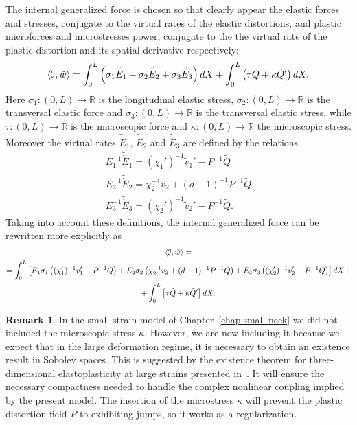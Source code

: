 \documentclass[a4paper,10pt,oneside]{amsbook}
\numberwithin{section}{chapter}
\numberwithin{equation}{chapter}
\theoremstyle{definition}
\newtheorem{rmk}[prop]{Remark}
\DeclarePairedDelimiter{\dual}{\langle}{\rangle}
\begin{document}
The internal generalized force is chosen so that clearly appear the elastic forces and stresses, conjugate to the virtual rates of the elastic distortions, and plastic microforces and microstresses power, conjugate to the the virtual rate of the plastic distortion and its spatial derivative respectively:
\[
\dual{\mathcal{I},\tilde w}=\int_0^L\left(\sigma_1\tilde{\dot E}_1+\sigma_2\tilde{\dot E}_2+\sigma_3\tilde{\dot E}_3\right)dX+\int_0^L\left(\tau\tilde{Q}+\kappa\tilde{Q}'\right)dX.
\]
Here $\sigma_1\colon(0,L)\to\mathbb{R}$ is the longitudinal elastic stress, $\sigma_2\colon(0,L)\to\mathbb{R}$ is the transversal elastic force and $\sigma_3\colon(0,L)\to\mathbb{R}$ is the transversal elastic stress, while $\tau\colon(0,L)\to\mathbb{R}$ is the microscopic force and $\kappa\colon(0,L)\to\mathbb{R}$ the microscopic stress. Moreover the virtual rates $\tilde{\dot E}_1$, $\tilde{\dot E}_2$ and $\tilde{\dot E}_3$ are defined by the relations
\begin{gather*}
E_1^{-1}\tilde{\dot E}_1=(\chi_1')^{-1}\tilde{v}_1'-P^{-1}\tilde{Q} \\
E_2^{-1}\tilde{\dot E}_2=\chi_2^{-1}\tilde{v}_2+(d-1)^{-1}P^{-1}\tilde{Q}\\
E_3^{-1}\tilde{\dot E}_3=(\chi_2')^{-1}\tilde{v}_2'-P^{-1}\tilde{Q}.
\end{gather*}
Taking into account these definitions, the internal generalized force can be rewritten more explicitly as
\begin{multline*}
\dual{\mathcal{I},\tilde w}=\\
=\int_0^L\left[E_1\sigma_1\left((\chi_1')^{-1}\tilde v_1'-P^{-1}\tilde Q\right)+E_2\sigma_2\left(\chi_2^{-1}\tilde v_2+(d-1)^{-1}P^{-1}\tilde Q\right)+E_3\sigma_3\left((\chi_2')^{-1}\tilde v_2'-P^{-1}\tilde Q\right)\right]dX+\\
+\int_0^L\left[\tau\tilde Q+\kappa\tilde Q'\right]dX.
\end{multline*}
\begin{rmk}
In the small strain model of Chapter~\ref{chap:small-neck} we did not included the microscopic stress $\kappa$. However, we are now including it because we expect that in the large deformation regime, it is necessary to obtain an existence result in Sobolev spaces. This is suggested by the existence theorem for three-dimensional elastoplasticity at large strains presented in~\cite{mielke}. It will ensure the necessary compactness needed to handle the complex nonlinear coupling implied by the present model. The insertion of the microstress $\kappa$ will prevent the plastic distortion field $P$ to exhibiting jumps, so it works as a regularization.
\end{rmk}
\end{document}
